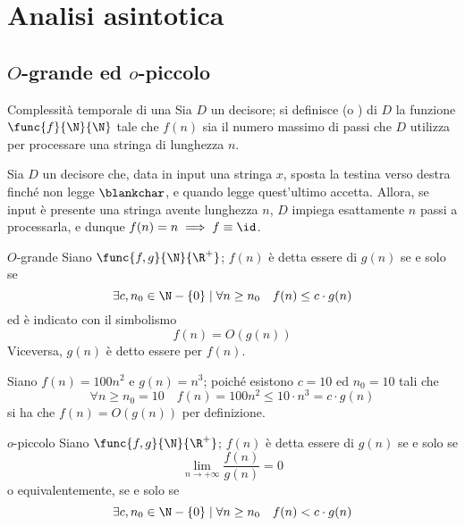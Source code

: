 \documentclass[a4paper, 12pt]{report}
\begin{document}
    \section{Analisi asintotica}
    
    \subsection{$O$-grande ed $o$-piccolo}

    \begin{frameddefn}{Complessità temporale di una \TM}
        Sia $D$ un decisore; si definisce  (o ) di $D$ la funzione $\func{f}{\N}{\N}$ tale che $f(n)$ sia il numero massimo di passi che $D$ utilizza per processare una stringa di lunghezza $n$.
    \end{frameddefn}

    \begin{example}
        Sia $D$ un decisore che, data in input una stringa $x$, sposta la testina verso destra finché non legge $\blankchar$, e quando legge quest'ultimo accetta. Allora, se input è presente una stringa avente lunghezza $n$, $D$ impiega esattamente $n$ passi a processarla, e dunque $f(n) = n \implies f \equiv \id$.
    \end{example}

    \begin{frameddefn}{$O$-grande}
        Siano $\func{f, g}{\N}{\R^+}$; $f(n)$ è detta essere  di $g(n)$ se e solo se $$\exists c, n_0 \in \N - \{0\} \mid \forall n \ge n_0 \quad f(n) \leq c \cdot g(n)$$ ed è indicato con il simbolismo $$f(n) = O(g(n))$$ Viceversa, $g(n)$ è detto essere  per $f(n)$.
    \end{frameddefn}

    \begin{example}[$O$-grande]
        \label{big o ex}
        Siano $f(n) = 100 n^2$ e $g(n) = n^3$; poiché esistono $c = 10$ ed $n_0 = 10$ tali che $$\forall n \ge n_0 = 10 \quad f(n) = 100 n^2 \leq 10 \cdot n^3 = c \cdot g(n)$$ si ha che $f(n) = O(g(n))$ per definizione.
    \end{example}

    \begin{frameddefn}{$o$-piccolo}
        Siano $\func{f, g}{\N}{\R^+}$; $f(n)$ è detta essere  di $g(n)$ se e solo se $$\lim_{n \to + \infty}{\dfrac{f(n)}{g(n)}} = 0$$ o equivalentemente, se e solo se $$\exists c, n_0 \in \N - \{0\} \mid \forall n \ge n_0 \quad f(n) < c \cdot g(n)$$
    \end{frameddefn}
\end{document}
